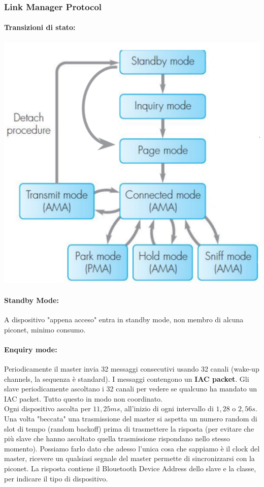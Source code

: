 \newpage

\subsubsection{Link Manager Protocol}
\paragraph{Transizioni di stato:}
\begin{center}
	\includegraphics[width=0.55\linewidth]{img/wpan/lmpst}
\end{center}

\paragraph{Standby Mode:} A dispositivo "appena acceso" entra in standby mode, non membro di alcuna piconet, minimo consumo.\\

\paragraph{Enquiry mode:} Periodicamente il master invia 32 messaggi consecutivi usando 32 canali (wake-up channels, la sequenza  è standard). I messaggi contengono un \textbf{IAC packet}. Gli slave periodicamente ascoltano i 32 canali per vedere se qualcuno ha mandato un IAC packet. Tutto questo in modo non coordinato.\\

Ogni dispositivo ascolta per $11,25 ms$, all'inizio di ogni intervallo di $1,28$ o $2,56 s$. Una volta "beccata" una trasmissione del master si aspetta un numero random di slot di tempo (random backoff) prima di trasmettere la risposta (per evitare che più slave che hanno ascoltato quella trasmissione rispondano nello stesso momento). Possiamo farlo dato che adesso l'unica cosa che sappiamo è il clock del master, ricevere un qualsiasi segnale del master permette di sincronizzarsi con la piconet. La risposta contiene il Blouetooth Device Address dello slave e la classe, per indicare il tipo di dispositivo.\\

